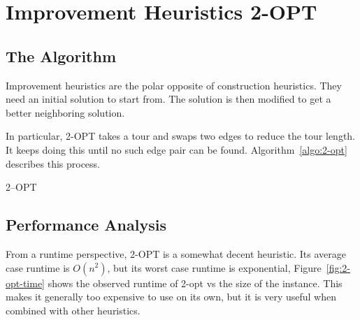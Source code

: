 \section{Improvement Heuristics 2-OPT}

\subsection{The Algorithm}

Improvement heuristics are the polar opposite of construction heuristics. They need an initial solution to start from. The solution is then modified to get a better neighboring solution.

In particular, 2-OPT takes a tour and swaps two edges to reduce the tour length. It keeps doing this until no such edge pair can be found. Algorithm~\ref{algo:2-opt} describes this process.

\begin{algorithm}
    \caption{2--OPT}
    \label{algo:2-opt}


\end{algorithm}

\subsection{Performance Analysis}

From a runtime perspective, 2-OPT is a somewhat decent heuristic. Its average case runtime is \(O(n^2)\), but its worst case runtime is exponential, Figure~\ref{fig:2-opt-time} shows the observed runtime of 2-opt vs the size of the instance. This makes it generally too expensive to use on its own, but it is very useful when combined with other heuristics.

